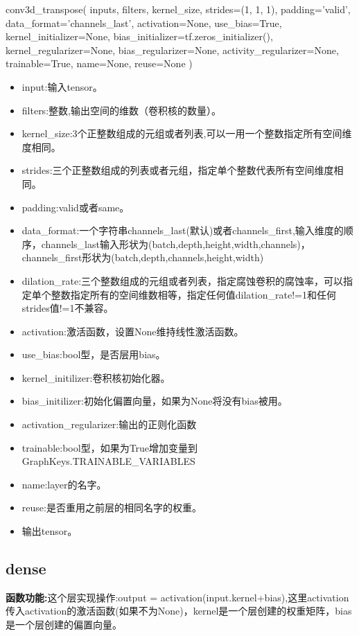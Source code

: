 \begin{python}
conv3d_transpose(
    inputs,
    filters,
    kernel_size,
    strides=(1, 1, 1),
    padding='valid',
    data_format='channels_last',
    activation=None,
    use_bias=True,
    kernel_initializer=None,
    bias_initializer=tf.zeros_initializer(),
    kernel_regularizer=None,
    bias_regularizer=None,
    activity_regularizer=None,
    trainable=True,
    name=None,
    reuse=None
)
\end{python}
\begin{itemize}
	\item input:输入tensor。
	\item filters:整数,输出空间的维数（卷积核的数量）。
	\item kernel\_size:3个正整数组成的元组或者列表,可以一用一个整数指定所有空间维度相同。
	\item strides:三个正整数组成的列表或者元组，指定单个整数代表所有空间维度相同。
	\item padding:valid或者same。
	\item data\_format:一个字符串channels\_last(默认)或者channels\_first,输入维度的顺序，channels\_last输入形状为(batch,depth,height,width,channels)，channels\_first形状为(batch,depth,channels,height,width)
	\item dilation\_rate:三个整数组成的元组或者列表，指定腐蚀卷积的腐蚀率，可以指定单个整数指定所有的空间维数相等，指定任何值dilation\_rate!=1和任何strides值!=1不兼容。
	\item activation:激活函数，设置None维持线性激活函数。
	\item use\_bias:bool型，是否层用bias。
	\item kernel\_initilizer:卷积核初始化器。
	\item bias\_initilizer:初始化偏置向量，如果为None将没有bias被用。
	\item activation\_regularizer:输出的正则化函数
	\item trainable:bool型，如果为True增加变量到GraphKeys.TRAINABLE\_VARIABLES
	\item name:layer的名字。
	\item reuse:是否重用之前层的相同名字的权重。
	\item 输出tensor。
\end{itemize}
\subsection{dense}
\textbf{函数功能:}这个层实现操作:output = activation(input.kernel+bias),这里activation传入activation的激活函数(如果不为None)，kernel是一个层创建的权重矩阵，bias是一个层创建的偏置向量。

